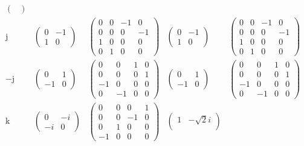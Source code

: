 \documentclass[
]{book}
\theoremstyle{definition}
\theoremstyle{definition}
\theoremstyle{definition}
\theoremstyle{definition}
\theoremstyle{remark}
\begin{document}
\[\begin{array}{ccccc}
\begin{pmatrix}
\end{pmatrix}\\
\mathrm{j} & \begin{pmatrix}0 & -1\\
1 & 0
\end{pmatrix} & \begin{pmatrix}0 & 0 & -1 & 0\\
0 & 0 & 0 & -1\\
1 & 0 & 0 & 0\\
0 & 1 & 0 & 0
\end{pmatrix} & \begin{pmatrix}0 & -1\\
1 & 0
\end{pmatrix} & \begin{pmatrix}0 & 0 & -1 & 0\\
0 & 0 & 0 & -1\\
1 & 0 & 0 & 0\\
0 & 1 & 0 & 0
\end{pmatrix}\\
-\mathrm{j} & \begin{pmatrix}0 & 1\\
-1 & 0
\end{pmatrix} & \begin{pmatrix}0 & 0 & 1 & 0\\
0 & 0 & 0 & 1\\
-1 & 0 & 0 & 0\\
0 & -1 & 0 & 0
\end{pmatrix} & \begin{pmatrix}0 & 1\\
-1 & 0
\end{pmatrix} & \begin{pmatrix}0 & 0 & 1 & 0\\
0 & 0 & 0 & 1\\
-1 & 0 & 0 & 0\\
0 & -1 & 0 & 0
\end{pmatrix}\\
\mathrm{k} & \begin{pmatrix}0 & -i\\
-i & 0
\end{pmatrix} & \begin{pmatrix}0 & 0 & 0 & 1\\
0 & 0 & -1 & 0\\
0 & 1 & 0 & 0\\
-1 & 0 & 0 & 0
\end{pmatrix} & \begin{pmatrix}1 & -\sqrt{2}i\\

\end{pmatrix}
\end{array}\]
\end{document}
